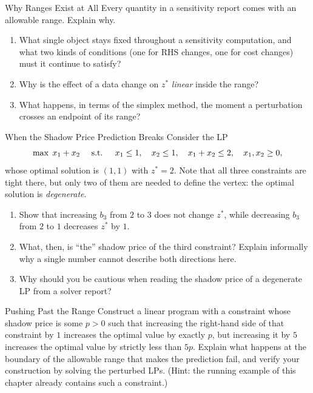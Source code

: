 \begin{ex}{Why Ranges Exist at All}{}
 Every quantity in a sensitivity report comes with an allowable range. Explain why.
\begin{enumerate}
\item What single object stays fixed throughout a sensitivity computation, and what two kinds of conditions (one for RHS changes, one for cost changes) must it continue to satisfy?
\item Why is the effect of a data change on $z^*$ \emph{linear} inside the range?
\item What happens, in terms of the simplex method, the moment a perturbation crosses an endpoint of its range?
\end{enumerate}
\exrefs{\S\ref{sec:sensitivity-overview}, \S\ref{sec:sensitivity-rhs}, \S\ref{sec:sensitivity-cost}}
\end{ex}

\begin{ex}{When the Shadow Price Prediction Breaks}{}
 Consider the LP
\[
\max \; x_1 + x_2 \quad \text{ s.t. } \quad x_1 \leq 1, \quad x_2 \leq 1, \quad x_1 + x_2 \leq 2, \quad x_1, x_2 \geq 0,
\]
whose optimal solution is $(1,1)$ with $z^* = 2$. Note that all three constraints are tight there, but only two of them are needed to define the vertex: the optimal solution is \emph{degenerate}.
\begin{enumerate}
\item Show that increasing $b_3$ from $2$ to $3$ does not change $z^*$, while decreasing $b_3$ from $2$ to $1$ decreases $z^*$ by $1$.
\item What, then, is ``the'' shadow price of the third constraint? Explain informally why a single number cannot describe both directions here.
\item Why should you be cautious when reading the shadow price of a degenerate LP from a solver report?
\end{enumerate}
\exrefs{\S\ref{sec:sensitivity-rhs}, \S\ref{sec:sensitivity-software}}
\end{ex}


\begin{ex}{Pushing Past the Range}{}
\label{ex:sensitivity-range-boundary}
 Construct a linear program with a constraint whose shadow price is some $p > 0$ such that increasing the right-hand side of that constraint by $1$ increases the optimal value by exactly $p$, but increasing it by $5$ increases the optimal value by strictly less than $5p$. Explain what happens at the boundary of the allowable range that makes the prediction fail, and verify your construction by solving the perturbed LPs. (Hint: the running example of this chapter already contains such a constraint.)
\exrefs{\S\ref{sec:sensitivity-rhs}, \S\ref{sec:sensitivity-overview}}
\end{ex}

